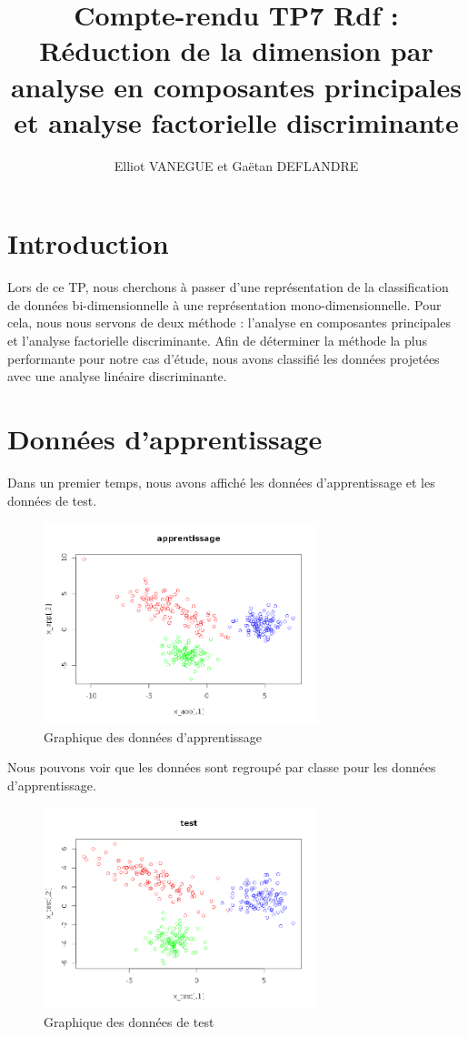 \documentclass[a4paper,11pt]{article}
\title{Compte-rendu TP7 Rdf : Réduction de la dimension par analyse en composantes principales et analyse factorielle discriminante}
\author{Elliot VANEGUE et Gaëtan DEFLANDRE}
\begin{document}


  \maketitle
  
  \mbox{}
  \newpage
  \clearpage
  
  \section*{Introduction}
  Lors de ce TP, nous cherchons à passer d'une représentation de la classification de données
  bi-dimensionnelle à une représentation mono-dimensionnelle. Pour cela, nous nous servons de
  deux méthode : l'analyse en composantes principales et l'analyse factorielle discriminante.
  Afin de déterminer la méthode la plus performante pour notre cas d'étude, nous avons classifié
  les données projetées avec une analyse linéaire discriminante.
 
  \section{Données d'apprentissage}
  Dans un premier temps, nous avons affiché les données d'apprentissage et les données de test.
  
  \begin{figure}[H]
    \center
   \includegraphics[width=8cm]{donnees_apprentissage.png}
   \caption{Graphique des données d'apprentissage}
  \end{figure}
  
  Nous pouvons voir que les données sont regroupé par classe pour les données d'apprentissage.
  
  \begin{figure}[H]
  \center
   \includegraphics[width=8cm]{donnees_test.png}
   \caption{Graphique des données de test}
  \end{figure}
  
\end{document}

